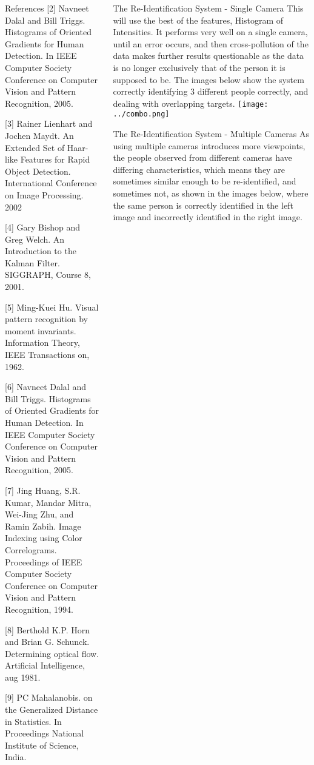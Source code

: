 \documentclass[final]{beamer}
\begin{document}
\begin{frame}{}
\begin{columns}[t]
\begin{column}{.49\linewidth}
\begin{block}{References}
[2] Navneet Dalal and Bill Triggs. Histograms of Oriented Gradients for Human Detection. In IEEE Computer Society Conference on Computer Vision and Pattern Recognition, 2005.
        
[3] Rainer Lienhart and Jochen Maydt. An Extended Set of Haar-like Features for Rapid Object Detection. International Conference on Image Processing. 2002
            
[4] Gary Bishop and Greg Welch. An Introduction to the Kalman Filter. SIGGRAPH, Course 8, 2001.
                
[5] Ming-Kuei Hu. Visual pattern recognition by moment invariants. Information Theory, IEEE Transactions on, 1962.
                 
[6] Navneet Dalal and Bill Triggs. Histograms of Oriented Gradients for Human Detection. In IEEE Computer Society Conference on Computer Vision and Pattern Recognition, 2005.
                  
[7] Jing Huang, S.R. Kumar, Mandar Mitra, Wei-Jing Zhu, and Ramin Zabih. Image Indexing using Color Correlograms. Proceedings of IEEE Computer Society Conference on Computer Vision and Pattern Recognition, 1994.
                   
[8] Berthold K.P. Horn and Brian G. Schunck. Determining optical flow. Artificial Intelligence, aug 1981.
                   
[9] PC Mahalanobis. on the Generalized Distance in Statistics. In Proceedings National Institute of Science, India.
    \end{block}
        
	 \end{column}
	 \begin{column}{.49\linewidth}
 		\begin{block}{The Re-Identification System - Single Camera}
 		\vspace{-.5cm}
 		\justify This will use the best of the features, Histogram of Intensities. It performs very well on a single camera, until an error occurs, and then cross-pollution of the data makes further results questionable as the data is no longer exclusively that of the person it is supposed to be. 
 		The images below show the system correctly identifying 3 different people correctly, and dealing with overlapping targets. 
 		\justify
 		\texttt{[image: ../combo.png]}  
         
        \end{block}
        
        \begin{block}{The Re-Identification System - Multiple Cameras}
        \vspace{-.5cm}
        \justify As using multiple cameras introduces more viewpoints, the people observed from different cameras have differing characteristics, which means they are sometimes similar enough to be re-identified, and sometimes not, as shown in the images below, where the same person is correctly identified in the left image and incorrectly identified in the right image. 	
        	 

\end{block}
\end{column}
\end{columns}
\end{frame}
\end{document}
